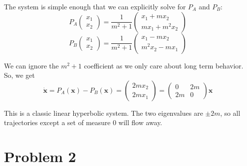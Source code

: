 \documentclass[psamsfonts]{amsart}
\theoremstyle{definition}
\theoremstyle{remark}
\numberwithin{equation}{section}
\begin{document}
The system is simple enough that we can explicitly solve for $P_A$ and $P_B$:
\[
P_A \left( 
\begin{matrix}
x_1 \\ x_2
\end{matrix}
\right)
= 
\frac{1}{m^2 + 1}
\left(
\begin{matrix}
x_1 + mx_2 \\
mx_1 + m^2x_2
\end{matrix}
\right)
\]
\[
P_B \left( 
\begin{matrix}
x_1 \\ x_2
\end{matrix}
\right)
= 
\frac{1}{m^2 + 1}
\left(
\begin{matrix}
x_1 - mx_2 \\
m^2x_2 - mx_1
\end{matrix}
\right)
\]

We can ignore the $m^2 + 1$ coefficient as we only care about long term behavior.
So, we get
\[
\dot{\mathbf{x}} = 
P_A(\mathbf{x}) - P_B(\mathbf{x}) = 
\left(
\begin{matrix}
2mx_2 \\ 2mx_1
\end{matrix}
\right) 
= 
\left(
\begin{matrix}
0 & 2m \\
2m & 0
\end{matrix}
\right)
\mathbf{x}
\]


This is a classic linear hyperbolic system. The two eigenvalues are $\pm 2m$, so all trajectories except a set of measure $0$ will flow away.


\section{Problem 2}
\end{document}
